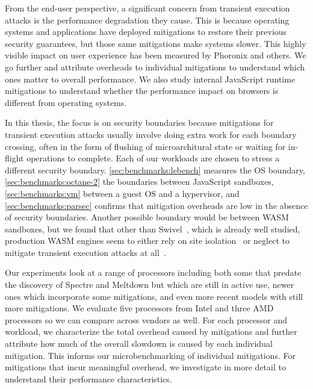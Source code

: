 
From the end-user perspective, a significant concern from transient execution attacks is the performance degradation they cause.
This is because operating systems and applications have deployed mitigations to restore their previous security guarantees, but those same mitigations make systems slower.
This highly visible impact on user experience has been measured by Phoronix and others.
We go further and attribute overheads to individual mitigations to understand which ones matter to overall performance.
We also study internal JavaScript runtime mitigations to understand whether the performance impact on browsers is different from operating systems. 

In this thesis, the focus is on security boundaries because mitigations for transient execution attacks usually involve doing extra work for each boundary crossing, often in the form of flushing of microarchitural state or waiting for in-flight operations to complete.
Each of our workloads are chosen to stress a different security boundary.
\autoref{sec:benchmarks:lebench} measures the OS boundary, \autoref{sec:benchmarks:octane-2} the boundaries between JavaScript sandboxes, \autoref{sec:benchmarks:vm} between a guest OS and a hypervisor, and \autoref{sec:benchmarks:parsec} confirms that mitigation overheads are low in the absence of security boundaries.
Another possible boundary would be between WASM sandboxes, but we found that other than Swivel~\cite{narayan:swivel}, which is already well studied, production WASM engines seem to either rely on site isolation~\cite{reis:site-isolation} or neglect to mitigate transient execution attacks at all~\cite{cranelift:wasm-no-mitigations}.

Our experiments look at a range of processors including both some that predate the discovery of Spectre and Meltdown but which are still in active use, newer ones which incorporate some mitigations, and even more recent models with still more mitigations.
We evaluate five processors from Intel and three AMD processors so we can compare across vendors as well.
For each processor and workload, we characterize the total overhead caused by mitigations and further attribute how much of the overall slowdown is caused by each individual mitigation.
This informs our microbenchmarking of individual mitigations.
For mitigations that incur meaningful overhead, we investigate in more detail to understand their performance characteristics.

